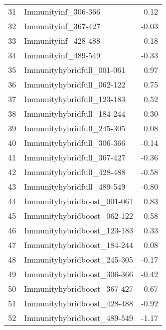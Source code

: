 \begin{table}[ht]
\begin{tabular}{rlr}
  31 & Immunityinf\_306-366 & 0.12 \\ 
  32 & Immunityinf\_367-427 & -0.03 \\ 
  33 & Immunityinf\_428-488 & -0.18 \\ 
  34 & Immunityinf\_489-549 & -0.33 \\ 
  35 & Immunityhybridfull\_001-061 & 0.97 \\ 
  36 & Immunityhybridfull\_062-122 & 0.75 \\ 
  37 & Immunityhybridfull\_123-183 & 0.52 \\ 
  38 & Immunityhybridfull\_184-244 & 0.30 \\ 
  39 & Immunityhybridfull\_245-305 & 0.08 \\ 
  40 & Immunityhybridfull\_306-366 & -0.14 \\ 
  41 & Immunityhybridfull\_367-427 & -0.36 \\ 
  42 & Immunityhybridfull\_428-488 & -0.58 \\ 
  43 & Immunityhybridfull\_489-549 & -0.80 \\ 
  44 & Immunityhybridboost\_001-061 & 0.83 \\ 
  45 & Immunityhybridboost\_062-122 & 0.58 \\ 
  46 & Immunityhybridboost\_123-183 & 0.33 \\ 
  47 & Immunityhybridboost\_184-244 & 0.08 \\ 
  48 & Immunityhybridboost\_245-305 & -0.17 \\ 
  49 & Immunityhybridboost\_306-366 & -0.42 \\ 
  50 & Immunityhybridboost\_367-427 & -0.67 \\ 
  51 & Immunityhybridboost\_428-488 & -0.92 \\ 
  52 & Immunityhybridboost\_489-549 & -1.17 \\ 
   \hline
\end{tabular}
\end{table}
